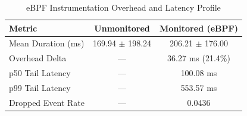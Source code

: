 \begin{table}[t]
\centering
\caption{eBPF Instrumentation Overhead and Latency Profile}
\label{tab:overhead_profile}
\begin{tabular}{lcc}
\hline
\textbf{Metric} & \textbf{Unmonitored} & \textbf{Monitored (eBPF)} \\
\hline
Mean Duration (ms) & 169.94 $\pm$ 198.24 & 206.21 $\pm$ 176.00 \\
Overhead Delta & --- & 36.27 ms (21.4\%) \\
p50 Tail Latency & --- & 100.08 ms \\
p99 Tail Latency & --- & 553.57 ms \\
Dropped Event Rate & --- & 0.0436 \\
\hline
\end{tabular}
\end{table}
